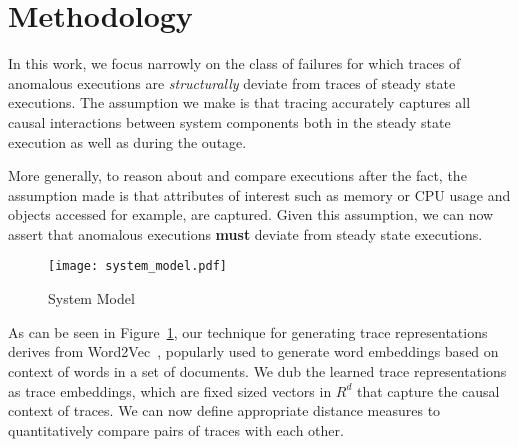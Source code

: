 \section{Methodology}
\label{methodology}
In this work, we focus narrowly on the class of failures for which traces of anomalous executions are \textit{structurally} deviate from traces of steady state executions. The assumption we make is that tracing accurately captures all causal interactions between system components both in the steady state execution as well as during the outage.

More generally, to reason about and compare executions after the fact, the assumption made is that attributes of interest such as memory or CPU usage and objects accessed for example, are captured.  Given this assumption, we can now assert that anomalous executions \textbf{must} deviate from steady state executions.

\begin{figure}[h]
\begin{center}
\texttt{[image: system\_model.pdf]}
\caption{System Model} 
\label{System_model}
\end{center}
\end{figure}

As can be seen in Figure~\ref{System_model}, our technique for generating trace representations derives from Word2Vec~\cite{Mikholv:2013:Word2vec}, popularly used to generate word embeddings based on context of words in a set of documents. We dub the learned trace representations as trace embeddings, which are fixed sized vectors in $R^{d}$ that capture the causal context of traces. We can now define appropriate distance measures to quantitatively compare pairs of traces with each other. 


